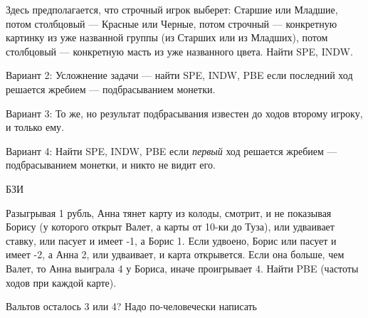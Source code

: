\begin{problem}
Здесь предполагается, что строчный игрок выберет: Старшие
или Младшие, потом столбцовый --- Красные или Черные, потом
строчный --- конкретную картинку из уже названной группы (из
Старших или из Младших), потом столбцовый --- конкретную
масть из уже названного цвета. Найти SPE, INDW.

Вариант 2: Усложнение задачи --- найти SPE, INDW, PBE если
последний ход решается жребием --- подбрасыванием монетки.

Вариант 3: То же, но результат подбрасывания известен до
ходов второму игроку, и только ему.

Вариант 4: Найти SPE, INDW, PBE если {\em первый} ход
решается жребием --- подбрасыванием монетки, и никто не видит
его.






\begin{sol}

\end{sol}
\end{problem}




\begin{problem} 
\begin{source}
БЗИ
\end{source}
 Разыгрывая 1
рубль, Анна тянет карту из колоды, смотрит, и не показывая
Борису (у которого открыт Валет, а карты от 10-ки до Туза), или
удваивает ставку, или пасует и имеет -1, а Борис 1. Если
удвоено, Борис или пасует и имеет -2, а Анна 2, или удваивает, и
карта открывется. Если она больше, чем Валет, то Анна выиграла 4
у Бориса, иначе проигрывает 4. Найти PBE (частоты ходов при
каждой карте).

{\red Вальтов осталось 3 или 4? Надо по-человечески написать}

\begin{sol}
\end{sol}
\end{problem}




